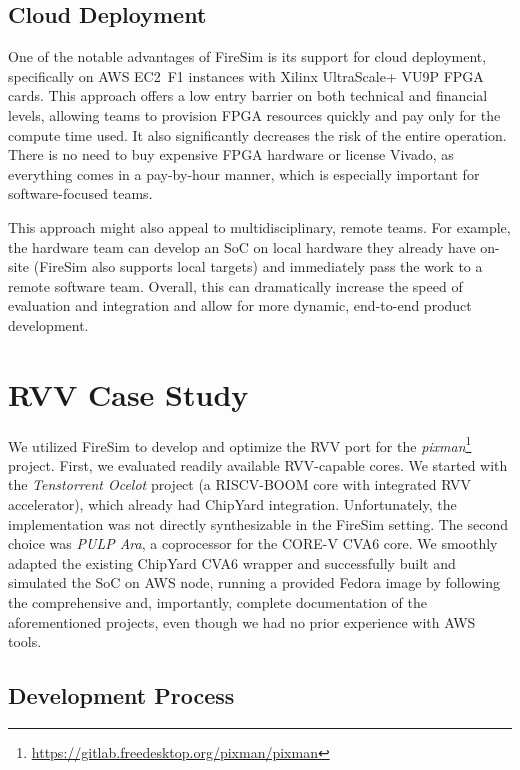 \documentclass[
	a4paper, %
	10pt, %
	unnumberedsections, %
	twoside, %
]{LTJournalArticle}
\begin{document}
\subsection{Cloud Deployment}

One of the notable advantages of FireSim is its support for cloud deployment,
specifically on AWS EC2~F1 instances with Xilinx UltraScale+ VU9P FPGA cards.
This approach offers a low entry barrier on both technical and financial levels,
allowing teams to provision FPGA resources quickly and pay only for the compute
time used. It also significantly decreases the risk of the entire operation.
There is no need to buy expensive FPGA hardware or license Vivado, as everything
comes in a pay-by-hour manner, which is especially important for
software-focused teams.

This approach might also appeal to multidisciplinary, remote teams. For example,
the hardware team can develop an SoC on local hardware they already have on-site
(FireSim also supports local targets) and immediately pass the work to a remote
software team. Overall, this can dramatically increase the speed of evaluation
and integration and allow for more dynamic, end-to-end product development.

\section{RVV Case Study}

We utilized FireSim to develop and optimize the RVV port for the
\emph{pixman}\footnote{\url{https://gitlab.freedesktop.org/pixman/pixman}}
project. First, we evaluated readily available RVV-capable cores. We started
with the \emph{Tenstorrent Ocelot}\autocite{ocelot} project (a RISCV-BOOM core
with integrated RVV accelerator), which already had ChipYard integration.
Unfortunately, the implementation was not directly synthesizable in the FireSim
setting. The second choice was \emph{PULP Ara}\autocite{Ara2020}, a coprocessor
for the CORE-V CVA6 core. We smoothly adapted the existing ChipYard CVA6 wrapper
and successfully built and simulated the SoC on AWS node, running a provided
Fedora image by following the comprehensive and, importantly, complete
documentation of the aforementioned projects, even though we had no prior
experience with AWS tools.

\subsection{Development Process}
\end{document}
